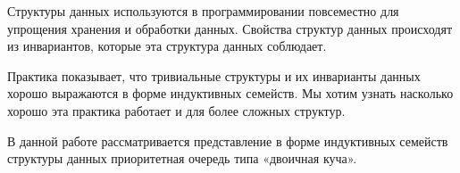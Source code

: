 \startprefacepage

Структуры данных используются в программировании повсеместно для
упрощения хранения и обработки данных.
Свойства структур данных происходят из инвариантов, которые эта структура
данных соблюдает.

Практика показывает, что тривиальные структуры и их инварианты
данных хорошо выражаются в форме индуктивных семейств.
Мы хотим узнать насколько хорошо эта практика работает и для более сложных структур.

В данной работе рассматривается представление в форме индуктивных семейств
структуры данных приоритетная очередь типа «двоичная куча».
\newline

